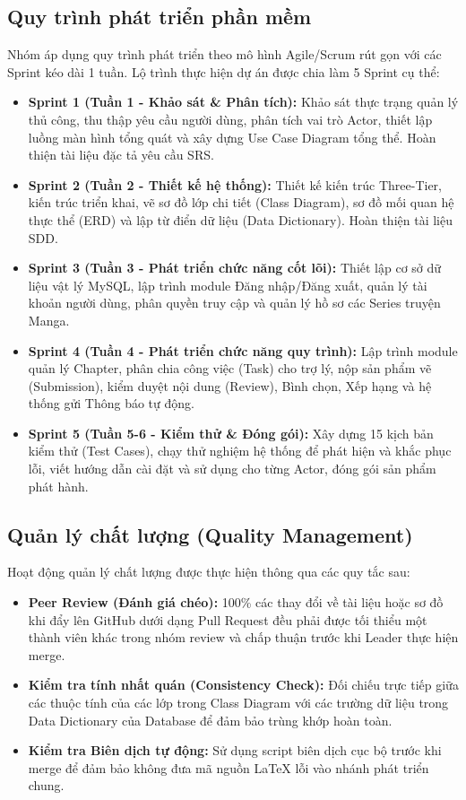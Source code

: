 \subsection{Quy trình phát triển phần mềm}
\label{subsec:spmp_process}

Nhóm áp dụng quy trình phát triển theo mô hình Agile/Scrum rút gọn với các Sprint kéo dài 1 tuần. Lộ trình thực hiện dự án được chia làm 5 Sprint cụ thể:
\begin{itemize}
    \item \textbf{Sprint 1 (Tuần 1 - Khảo sát \& Phân tích):} Khảo sát thực trạng quản lý thủ công, thu thập yêu cầu người dùng, phân tích vai trò Actor, thiết lập luồng màn hình tổng quát và xây dựng Use Case Diagram tổng thể. Hoàn thiện tài liệu đặc tả yêu cầu SRS.
    \item \textbf{Sprint 2 (Tuần 2 - Thiết kế hệ thống):} Thiết kế kiến trúc Three-Tier, kiến trúc triển khai, vẽ sơ đồ lớp chi tiết (Class Diagram), sơ đồ mối quan hệ thực thể (ERD) và lập từ điển dữ liệu (Data Dictionary). Hoàn thiện tài liệu SDD.
    \item \textbf{Sprint 3 (Tuần 3 - Phát triển chức năng cốt lõi):} Thiết lập cơ sở dữ liệu vật lý MySQL, lập trình module Đăng nhập/Đăng xuất, quản lý tài khoản người dùng, phân quyền truy cập và quản lý hồ sơ các Series truyện Manga.
    \item \textbf{Sprint 4 (Tuần 4 - Phát triển chức năng quy trình):} Lập trình module quản lý Chapter, phân chia công việc (Task) cho trợ lý, nộp sản phẩm vẽ (Submission), kiểm duyệt nội dung (Review), Bình chọn, Xếp hạng và hệ thống gửi Thông báo tự động.
    \item \textbf{Sprint 5 (Tuần 5-6 - Kiểm thử \& Đóng gói):} Xây dựng 15 kịch bản kiểm thử (Test Cases), chạy thử nghiệm hệ thống để phát hiện và khắc phục lỗi, viết hướng dẫn cài đặt và sử dụng cho từng Actor, đóng gói sản phẩm phát hành.
\end{itemize}

\subsection{Quản lý chất lượng (Quality Management)}
\label{subsec:spmp_quality}

Hoạt động quản lý chất lượng được thực hiện thông qua các quy tắc sau:
\begin{itemize}
    \item \textbf{Peer Review (Đánh giá chéo):} 100\% các thay đổi về tài liệu hoặc sơ đồ khi đẩy lên GitHub dưới dạng Pull Request đều phải được tối thiểu một thành viên khác trong nhóm review và chấp thuận trước khi Leader thực hiện merge.
    \item \textbf{Kiểm tra tính nhất quán (Consistency Check):} Đối chiếu trực tiếp giữa các thuộc tính của các lớp trong Class Diagram với các trường dữ liệu trong Data Dictionary của Database để đảm bảo trùng khớp hoàn toàn.
    \item \textbf{Kiểm tra Biên dịch tự động:} Sử dụng script biên dịch cục bộ trước khi merge để đảm bảo không đưa mã nguồn LaTeX lỗi vào nhánh phát triển chung.
\end{itemize}

